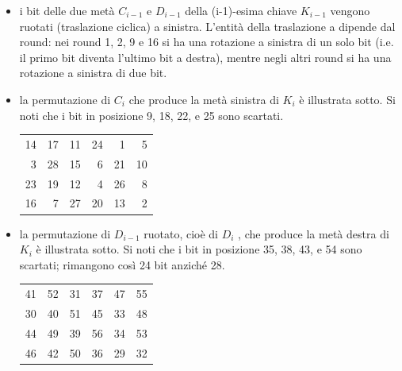 \begin{itemize}
  \item i bit delle due metà $C_{i-1}$ e $D_{i-1}$ della (i-1)-esima chiave $K_{i-1}$ vengono ruotati (traslazione ciclica) a sinistra. L'entità della traslazione a dipende dal round: nei round 1, 2, 9 e 16 si ha una rotazione a sinistra di un solo bit (i.e. il primo bit diventa l'ultimo bit a destra), mentre negli altri round si ha una rotazione a sinistra di due bit.
  \item la permutazione di $C_{i}$ che produce la metà sinistra di $K_{i}$ è illustrata sotto. Si noti che i bit in posizione 9, 18, 22, e 25 sono scartati.
  	\begin{table}[h]
  	\centering
	\begin{tabular}{rrrrrr}
	14 & 17 & 11 & 24 & 1  & 5  \\
	3  & 28 & 15 & 6  & 21 & 10 \\
	23 & 19 & 12 & 4  & 26 & 8  \\
	16 & 7  & 27 & 20 & 13 & 2 
	\end{tabular}
	\end{table}
  \item la permutazione di $D_{i-1}$ ruotato, cioè di $D_{i}$ , che produce la metà destra di $K_{i}$ è illustrata sotto. Si noti che i bit in posizione 35, 38, 43, e 54 sono scartati; rimangono così 24 bit anziché 28.
  	\begin{table}[h]
  	\centering
	\begin{tabular}{llllll}
	41 & 52 & 31 & 37 & 47 & 55  \\
	30 & 40 & 51 & 45 & 33 & 48 \\
	44 & 49 & 39 & 56 & 34 & 53  \\
	46 & 42 & 50 & 36 & 29 & 32 
	\end{tabular}
	\end{table}
\end{itemize}

